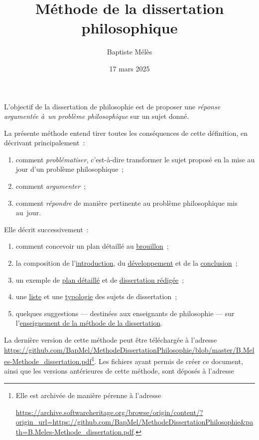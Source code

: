 \documentclass[a4paper,12pt]{report}
\author{Baptiste Mélès}
\date{17 mars 2025}
\title{Méthode de la dissertation philosophique}
\begin{document}
\maketitle
\bigskip

L'objectif de la dissertation de philosophie est de proposer une
\emph{réponse argumentée à un problème philosophique} sur un sujet donné.

La présente méthode entend tirer toutes les conséquences de cette
définition, en décrivant principalement :
\begin{enumerate}
\item comment \emph{problématiser}, c'est-à-dire transformer le sujet proposé en la
mise au jour d'un problème philosophique ;
\item comment \emph{argumenter} ;
\item comment \emph{répondre} de manière pertinente au problème philosophique
mis au jour.
\end{enumerate}

Elle décrit successivement :
\begin{enumerate}
\item comment concevoir un plan détaillé au \hyperref[org25cebf6]{brouillon} ;
\item la composition de l'\hyperref[orgf5d9f0e]{introduction}, du \hyperref[orgc7811f7]{développement} et de la
\hyperref[org32668ac]{conclusion} ;
\item un exemple de \hyperref[org7009d53]{plan détaillé} et de \hyperref[org7ad7ab3]{dissertation rédigée} ;
\item une \hyperref[org53d71c0]{liste} et une \hyperref[org160ce83]{typologie} des sujets de dissertation ;
\item quelques suggestions — destinées aux enseignants de philosophie — sur
l'\hyperref[org438a5c8]{enseignement de la méthode de la dissertation}.
\end{enumerate}

La dernière version de cette méthode peut être téléchargée à l'adresse
\url{https://github.com/BapMel/MethodeDissertationPhilosophie/blob/master/B.Meles-Methode\_dissertation.pdf}\footnote{Elle est archivée de manière pérenne à l'adresse

\noindent
\url{https://archive.softwareheritage.org/browse/origin/content/?origin\_url=https://github.com/BapMel/MethodeDissertationPhilosophie\&path=B.Meles-Methode\_dissertation.pdf}.}.
Les fichiers ayant permis de créer ce document, ainsi que les versions
antérieures de cette méthode, sont déposés à l'adresse
\end{document}
